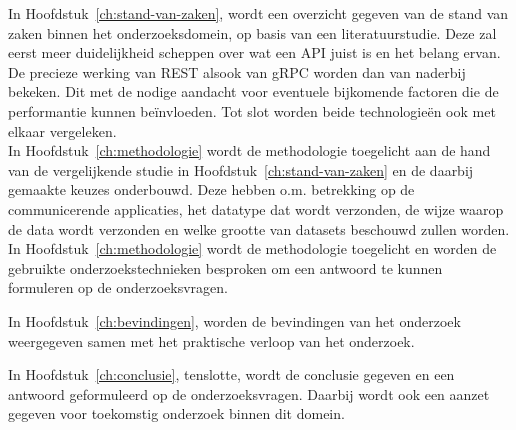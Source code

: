 In Hoofdstuk~\ref{ch:stand-van-zaken}, wordt een overzicht gegeven van de stand van zaken binnen het onderzoeksdomein, op basis van een literatuurstudie.
Deze zal eerst meer duidelijkheid scheppen over wat een API juist is en het belang ervan. De precieze werking van REST alsook van gRPC
worden dan van naderbij bekeken. Dit met de nodige aandacht voor eventuele bijkomende factoren die de performantie kunnen beïnvloeden.
Tot slot worden beide technologieën ook met elkaar vergeleken.\\

In Hoofdstuk~\ref{ch:methodologie} wordt de methodologie toegelicht aan de hand van de vergelijkende studie in Hoofdstuk~\ref{ch:stand-van-zaken} en de daarbij gemaakte keuzes onderbouwd.
Deze hebben o.m. betrekking op de communicerende applicaties, het datatype dat wordt verzonden, de wijze waarop de data wordt verzonden
en welke grootte van datasets beschouwd zullen worden.\\In Hoofdstuk~\ref{ch:methodologie} wordt de methodologie toegelicht en worden de gebruikte onderzoekstechnieken besproken om een antwoord te kunnen formuleren op de onderzoeksvragen.

In Hoofdstuk~\ref{ch:bevindingen}, worden de bevindingen van het onderzoek weergegeven samen met het praktische verloop van het onderzoek.

In Hoofdstuk~\ref{ch:conclusie}, tenslotte, wordt de conclusie gegeven en een antwoord geformuleerd op de onderzoeksvragen.
Daarbij wordt ook een aanzet gegeven voor toekomstig onderzoek binnen dit domein.